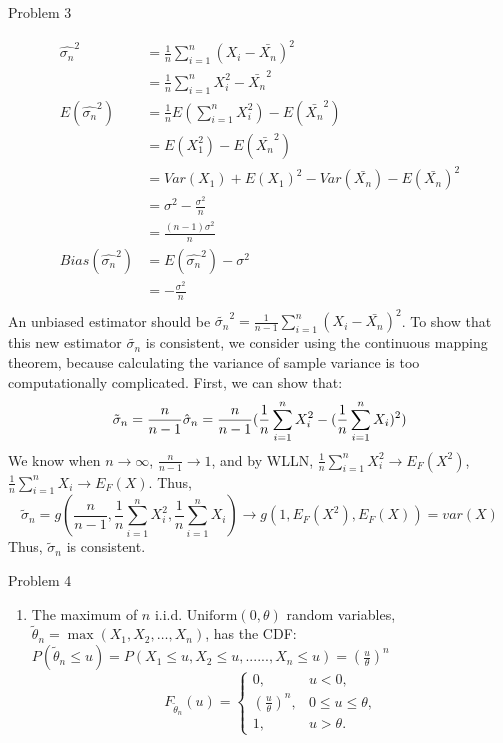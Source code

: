 \documentclass[12pt,letterpaper, onecolumn]{exam}
\begin{document}
\begin{questions}
    \question Problem 3
    \begin{solution}
        \begin{align*}
            \hat{\sigma_n}^2 & = \frac{1}{n} \sum_{i=1}^n(X_i-\bar{X_n})^2 \\
            & = \frac{1}{n}\sum_{i=1}^n X_i^2 - \bar{X_n}^2\\
            E(\hat{\sigma_n}^2) & = \frac{1}{n}E(\sum_{i=1}^nX_i^2) - E(\bar{X_n}^2) \\
            & = E(X_1^2) - E(\bar{X_n}^2) \\
            & = Var(X_1) + E(X_1)^2 - Var(\bar{X_n}) - E(\bar{X_n})^2 \\
            & = \sigma^2 - \frac{\sigma^2}{n} \\
            & = \frac{(n-1)\sigma^2}{n} \\
            Bias(\hat{\sigma_n}^2) & =  E(\hat{\sigma_n}^2) - \sigma^2 \\
            & = -\frac{\sigma^2}{n} \\
        \end{align*}
        An unbiased estimator should be $\tilde{\sigma_n}^2 = \frac{1}{n-1} \sum_{i=1}^n(X_i-\bar{X_n})^2$. 
        To show that this new estimator $\tilde{\sigma_n}$ is consistent, we consider using the continuous mapping theorem, because calculating the variance of sample variance is too computationally complicated. First, we can show that: 
        $$\tilde{\sigma}_n = \frac{n}{n-1} \hat{\sigma}_n  \\ = \frac{n}{n-1}(\frac{1}{n}\sum_{i=1}^n X_i^2-(\frac{1}{n}\sum_{i=1}^n X_i)^2)$$
        We know when $n \rightarrow \infty$,  $\frac{n}{n-1} \rightarrow 1$, and by WLLN, $\frac{1}{n}\sum_{i=1}^n X_i^2 \rightarrow E_F(X^2)$, $\frac{1}{n}\sum_{i=1}^n X_i \rightarrow E_F(X)$. Thus, $$\tilde{\sigma}_n = g(\frac{n}{n-1}, \frac{1}{n}\sum_{i=1}^n X_i^2, \frac{1}{n}\sum_{i=1}^n X_i) \rightarrow g(1,E_F(X^2), E_F(X)) = var(X)$$
        Thus, $\tilde{\sigma}_n$ is consistent.
    \end{solution}
 \question Problem 4
 \begin{solution}
     \begin{enumerate}
         \item The maximum of \(n\) i.i.d. \(\text{Uniform}(0, \theta)\) random variables, \(\tilde{\theta}_n = \max(X_1, X_2, \dots, X_n)\), has the CDF:
            $P(\tilde{\theta}_n \leq u) = P(X_1 \leq u, X_2 \leq u,......, X_n \leq u) = (\frac{u}{\theta})^n$
            \[
            F_{\tilde{\theta}_n}(u) =
            \begin{cases}
            0, & u < 0, \\
            \left(\frac{u}{\theta}\right)^n, & 0 \leq u \leq \theta, \\
            1, & u > \theta.
            \end{cases}
            \]


\end{enumerate}
\end{solution}
\end{questions}
\end{document}
